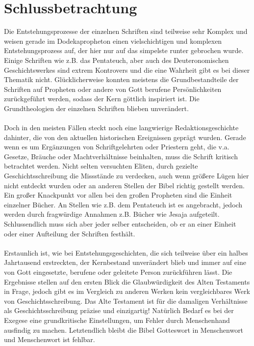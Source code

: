 \section{Schlussbetrachtung}
Die Entstehungsprozesse der einzelnen Schriften sind teilweise sehr Komplex und weisen gerade im Dodekapropheton einen vielschichtigen und komplexen Entstehungsprozess auf, der hier nur auf das simpelste runter gebrochen wurde. Einige Schriften wie z.B. das Pentateuch, aber auch des Deuteronomischen Geschichtswerkes sind extrem Kontrovers und die eine Wahrheit gibt es bei dieser Thematik nicht. Glücklicherweise konnten meistens die Grundbestandteile der Schriften auf Propheten oder andere von Gott berufene Persönlichkeiten zurückgeführt werden, sodass der Kern göttlich inspiriert ist. Die Grundtheologien der einzelnen Schriften blieben unverändert.
\\~\\
Doch in den meisten Fällen steckt noch eine langwierige Redaktionsgeschichte dahinter, die von den aktuellen historischen Ereignissen geprägt wurden. Gerade wenn es um Ergänzungen von Schriftgelehrten oder Priestern geht, die v.a. Gesetze, Bräuche oder Machtverhältnisse beinhalten, muss die Schrift kritisch betrachtet werden. Nicht selten versuchten Eliten, durch gezielte Geschichtsschreibung die Missstände zu verdecken, auch wenn größere Lügen hier nicht entdeckt wurden oder an anderen Stellen der Bibel richtig gestellt werden.
Ein großer Knackpunkt vor allen bei den großen Propheten sind die Einheit einzelner Bücher. An Stellen wie z.B. dem Pentateuch ist es angebracht, jedoch werden durch fragwürdige Annahmen z.B. Bücher wie Jesaja aufgeteilt. Schlussendlich muss sich aber jeder selber entscheiden, ob er an einer Einheit oder einer Aufteilung der Schriften festhält.
\\~\\
Erstaunlich ist, wie bei Entstehungsgeschichten, die sich teilweise über ein halbes Jahrtausend erstreckten, der Kernbestand unverändert blieb und immer auf eine von Gott eingesetzte, berufene oder geleitete Person zurückführen lässt. Die Ergebnisse stellen auf den ersten Blick die Glaubwürdigkeit des Alten Testaments in Frage, jedoch gibt es im Vergleich zu anderen Werken kein vergleichbares Werk von Geschichtsschreibung. Das Alte Testament ist für die damaligen Verhältnisse als Geschichtsschreibung präzise und einzigartig! Natürlich Bedarf es bei der Exegese eine grundkritische Einstellungen, um Fehler durch Menschenhand ausfindig zu machen. Letztendlich bleibt die Bibel Gotteswort in Menschenwort und Menschenwort ist fehlbar.
